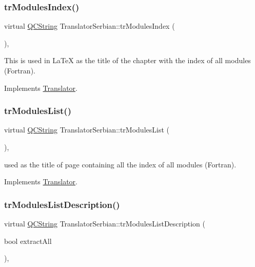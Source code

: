 \subsubsection{\texorpdfstring{trModulesIndex()}{trModulesIndex()}}
{\footnotesize\ttfamily virtual \mbox{\hyperlink{class_q_c_string}{Q\+C\+String}} Translator\+Serbian\+::tr\+Modules\+Index (\begin{DoxyParamCaption}{ }\end{DoxyParamCaption})\hspace{0.3cm}{\ttfamily [inline]}, {\ttfamily [virtual]}}

This is used in La\+TeX as the title of the chapter with the index of all modules (Fortran). 

Implements \mbox{\hyperlink{class_translator}{Translator}}.

\mbox{\label{class_translator_serbian_a6d5da6a378693620952fe3f3efb07d09}} 
\subsubsection{\texorpdfstring{trModulesList()}{trModulesList()}}
{\footnotesize\ttfamily virtual \mbox{\hyperlink{class_q_c_string}{Q\+C\+String}} Translator\+Serbian\+::tr\+Modules\+List (\begin{DoxyParamCaption}{ }\end{DoxyParamCaption})\hspace{0.3cm}{\ttfamily [inline]}, {\ttfamily [virtual]}}

used as the title of page containing all the index of all modules (Fortran). 

Implements \mbox{\hyperlink{class_translator}{Translator}}.

\mbox{\label{class_translator_serbian_ab811bf152ac5e033168d18b92f9961ae}} 
\subsubsection{\texorpdfstring{trModulesListDescription()}{trModulesListDescription()}}
{\footnotesize\ttfamily virtual \mbox{\hyperlink{class_q_c_string}{Q\+C\+String}} Translator\+Serbian\+::tr\+Modules\+List\+Description (\begin{DoxyParamCaption}\item[{bool}]{extract\+All }\end{DoxyParamCaption})\hspace{0.3cm}{\ttfamily [inline]}, {\ttfamily [virtual]}}

